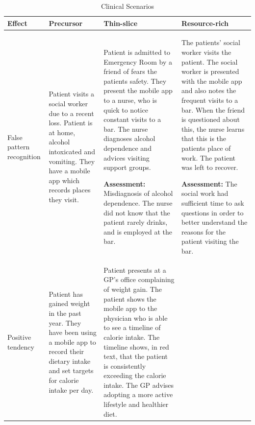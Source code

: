 \documentclass[a4paper]{scrartcl}     %
\begin{document}

    \begin{landscape}
      \pagestyle{plain}
      \small
      \renewcommand{\arraystretch}{2.5}
      \begin{longtabu} to \linewidth {X[1.3,l] X[3,p] X[5,p] X[5,p]}
      \caption{Clinical Scenarios}\\
      \toprule
      Effect & Precursor & Thin-slice & Resource-rich \\
      \midrule
      False pattern recognition
        & Patient visits a social worker due to a recent loss. Patient is at home, alcohol intoxicated and vomiting. They have a mobile app which records places they visit.

        & Patient is admitted to Emergency Room by a friend of fears the patients safety. They present the mobile app to a nurse, who is quick to notice constant visits to a bar. The nurse diagnoses alcohol dependence and advices visiting support groups.

        \textbf{Assessment:} Misdiagnosis of alcohol dependence. The nurse did not know that the patient rarely drinks, and is employed at the bar.

        & The patients' social worker visits the patient. The social worker is presented with the mobile app and also notes the frequent visits to a bar. When the friend is questioned about this, the nurse learns that this is the patients place of work. The patient was left to recover.

        \textbf{Assessment:} The social work had sufficient time to ask questions in order to better understand the reasons for the patient visiting the bar. \\

      Positive tendency
        & Patient has gained weight in the past year. They have been using a mobile app to record their dietary intake and set targets for calorie intake per day.

        & Patient presents at a GP's office complaining of weight gain. The patient shows the mobile app to the physician who is able to see a timeline of calorie intake. The timeline shows, in red text, that the patient is consistently exceeding the calorie intake. The GP advises adopting a more active lifestyle and healthier diet.


\end{longtabu}
\end{landscape}
\end{document}
